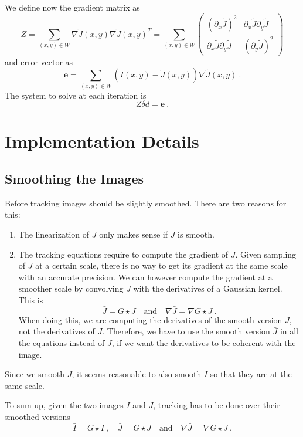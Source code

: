 \documentclass[a4paper,10pt]{article}
\begin{document}
We define now the gradient matrix as
\begin{equation}
 Z = \sum_{(x,y)\in W} \nabla \tilde J(x,y) \nabla \tilde J(x,y)^T
= \sum_{(x,y)\in W}
  \begin{pmatrix}
   (\partial_x \tilde J)^2
&  \partial_x \tilde J \partial_y\tilde J
\\ \partial_x \tilde J \partial_y\tilde J
&  (\partial_y \tilde J)^2
  \end{pmatrix}
\end{equation}
and error vector as
\begin{equation}
 \mathbf e = \sum_{(x,y)\in W} (I(x,y) - \tilde J(x,y)) \nabla \tilde J(x,y) \ .
\end{equation}
The system to solve at each iteration is
\begin{equation}
 Z \delta d = \mathbf e \ .
\end{equation}


\section{Implementation Details}
\subsection{Smoothing the Images}
Before tracking images should be slightly smoothed.  There are two reasons for this:
\begin{enumerate}
 \item The linearization of $J$ only makes sense if $J$ is smooth.
 \item The tracking equations require to compute the gradient of $J$.  Given sampling of $J$ at a certain scale, there is no way to get its gradient at the same scale with an accurate precision.  We can however compute the gradient at a smoother scale by convolving $J$ with the derivatives of a Gaussian kernel.  This is
 \begin{equation}
  \bar J = G \star J  \quad \text{and} \quad \nabla\bar J = \nabla G \star J \ .
 \end{equation}
When doing this, we are computing the derivatives of the smooth version $\bar J$, not the derivatives of $J$.  Therefore, we have to use the smooth version $\bar J$ in all the equations instead of $J$, if we want the derivatives to be coherent with the image.
\end{enumerate}
Since we smooth $J$, it seems reasonable to also smooth $I$ so that they are at the same scale.

To sum up, given the two images $I$ and $J$, tracking has to be done over their smoothed versions
\begin{equation}
  \bar I = G \star I \ , \quad 
  \bar J = G \star J  \quad \text{and} \quad
  \nabla\bar J = \nabla G \star J \ .
\end{equation}
\end{document}
